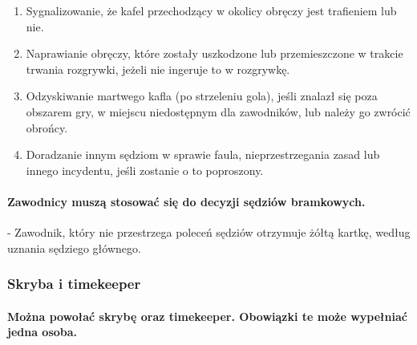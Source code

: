 \documentclass[12pt]{article}
\newcommand\yellowcard{\bgroup\color{yellow}\markoverwith{\textcolor{yellow}{\rule[-0.5ex]{2pt}{0.4pt}}}\ULon}
\begin{document}
\begin{enumerate}
	\item Sygnalizowanie, że kafel przechodzący w okolicy obręczy jest
	      trafieniem lub nie.

	\item Naprawianie obręczy, które zostały uszkodzone lub przemieszczone w
	      trakcie trwania rozgrywki, jeżeli nie ingeruje to w rozgrywkę.

	\item Odzyskiwanie martwego kafla (po strzeleniu gola), jeśli znalazł się
	      poza obszarem gry, w miejscu niedostępnym dla zawodników, lub należy go
	      zwrócić obrońcy.

	\item Doradzanie innym sędziom w sprawie faula, nieprzestrzegania zasad lub
	      innego incydentu, jeśli zostanie o to poproszony.
\end{enumerate}

\paragraph{Zawodnicy muszą stosować się do decyzji sędziów
	bramkowych.}

\yellowcard{Żółta kartka} - Zawodnik, który nie przestrzega poleceń sędziów
otrzymuje żółtą kartkę, według uznania sędziego głównego.

\subsubsection{Skryba i timekeeper}

\paragraph{Można powołać skrybę oraz timekeeper. Obowiązki te
	może wypełniać jedna osoba.}
\end{document}
